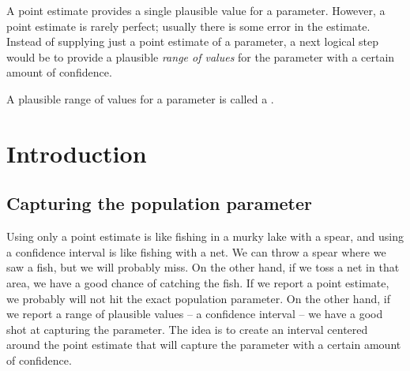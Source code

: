 

A point estimate provides a single plausible value for a parameter. However, a point estimate is rarely perfect; usually there is some error in the estimate. Instead of supplying just a point estimate of a parameter, a next logical step would be to provide a plausible \emph{range of values} for the parameter%
with a certain amount of confidence.

\begin{termBox}{
A plausible range of values for a  parameter is called a .%
}
\end{termBox}




\section{Introduction}
\label{sectionIntroductionOnCofidenceIntervals}

\subsection{Capturing the population parameter}

Using only a point estimate is like fishing in a murky lake with a spear, and using a confidence interval is like fishing with a net. We can throw a spear where we saw a fish, but we will probably miss. On the other hand, if we toss a net in that area, we have a good chance of catching the fish.
If we report a point estimate, we probably will not hit the exact population parameter. On the other hand, if we report a range of plausible values -- a confidence interval -- we have a good shot at capturing the parameter. 
The idea is to create an interval centered around the point estimate that will capture the parameter with a certain amount of confidence.

